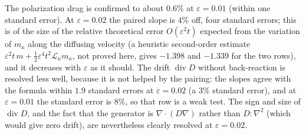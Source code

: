 \documentclass[11pt]{article}
\newcommand{\eps}{\varepsilon}
\newcommand{\cL}{\mathcal{L}}
\newcommand{\Div}{\operatorname{div}}
\theoremstyle{remark}
\begin{document}
The polarization drag is confirmed to about $0.6\%$ at $\eps=0.01$ (within
one standard error). At $\eps=0.02$ the paired slope is $4\%$ off, four
standard errors; this is of the size of the relative theoretical error
$O(\eps^2t)$ expected from the variation of $m_\kappa$ along the diffusing
velocity (a heuristic second-order estimate
$\eps^2t\,m+\tfrac12\eps^4t^2\cL_\kappa m_\kappa$, not proved here, gives
$-1.398$ and $-1.339$ for the two rows), and it decreases with $\eps$ as it
should. The drift $\Div D$ without back-reaction is resolved less well,
because it is not helped by the pairing: the slopes agree with the formula
within $1.9$ standard errors at $\eps=0.02$ (a $3\%$ standard error), and at
$\eps=0.01$ the standard error is $8\%$, so that row is a weak test. The
sign and size of $\Div D$, and the fact that the generator is
$\nabla\cdot(D\nabla)$ rather than $D:\nabla^2$ (which would give zero
drift), are nevertheless clearly resolved at $\eps=0.02$.
\end{document}
